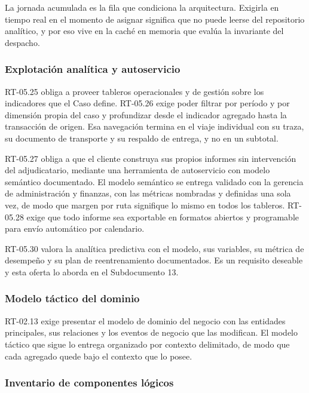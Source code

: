 La jornada acumulada es la fila que condiciona la arquitectura. Exigirla en tiempo real en el
momento de asignar significa que no puede leerse del repositorio analítico, y por eso vive en la
caché en memoria que evalúa la invariante del despacho.

\subsubsection{Explotación analítica y autoservicio}

RT-05.25 obliga a proveer tableros operacionales y de gestión sobre los indicadores que el Caso
define. RT-05.26 exige poder filtrar por período y por dimensión propia del caso y profundizar
desde el indicador agregado hasta la transacción de origen. Esa navegación termina en el viaje
individual con su traza, su documento de transporte y su respaldo de entrega, y no en un subtotal.

RT-05.27 obliga a que el cliente construya sus propios informes sin intervención del adjudicatario,
mediante una herramienta de autoservicio con modelo semántico documentado. El modelo semántico se
entrega validado con la gerencia de administración y finanzas, con las métricas nombradas y
definidas una sola vez, de modo que margen por ruta signifique lo mismo en todos los tableros.
RT-05.28 exige que todo informe sea exportable en formatos abiertos y programable para envío
automático por calendario.

RT-05.30 valora la analítica predictiva con el modelo, sus variables, su métrica de desempeño y su
plan de reentrenamiento documentados. Es un requisito deseable y esta oferta lo aborda en el
Subdocumento 13.

\subsubsection{Modelo táctico del dominio}

RT-02.13 exige presentar el modelo de dominio del negocio con las entidades principales, sus
relaciones y los eventos de negocio que las modifican. El modelo táctico que sigue lo entrega
organizado por contexto delimitado, de modo que cada agregado quede bajo el contexto que lo posee.


\subsubsection{Inventario de componentes lógicos}

